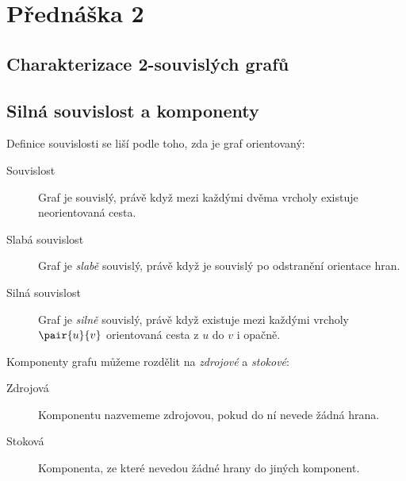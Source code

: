 \section{Přednáška 2}

\subsection{Charakterizace 2-souvislých grafů}



\subsection{Silná souvislost a komponenty}

Definice souvislosti se liší podle toho, zda je graf orientovaný:

\begin{description}
    \item[Souvislost] Graf je souvislý, právě když mezi každými dvěma vrcholy existuje neorientovaná cesta.
    \item[Slabá souvislost] Graf je \textit{slabě} souvislý, právě když je souvislý po odstranění orientace hran.
    \item[Silná souvislost] Graf je \textit{silně} souvislý, právě když existuje mezi každými vrcholy $\pair{u}{v}$ orientovaná cesta z $u$ do $v$ i opačně.
\end{description}



Komponenty grafu můžeme rozdělit na \textit{zdrojové} a \textit{stokové}:

\begin{description}
    \item[Zdrojová] Komponentu nazvememe zdrojovou, pokud do ní nevede žádná hrana.
    \item[Stoková] Komponenta, ze které nevedou žádné hrany do jiných komponent.
\end{description}

